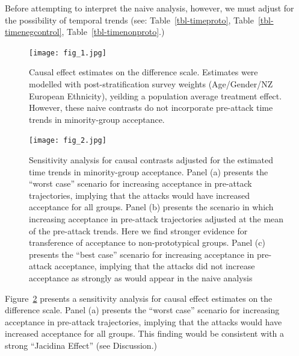 \documentclass[
  singlecolumn]{report}
\begin{document}
Before attempting to interpret the naive analysis, however, we must
adjust for the possibility of temporal trends (see:
Table~\ref{tbl-timeproto}, Table~\ref{tbl-timenegcontrol},
Table~\ref{tbl-timenonproto}.)

\begin{figure}

{\centering \texttt{[image: fig\_1.jpg]}

}

\caption{\label{fig-results1}Causal effect estimates on the difference
scale. Estimates were modelled with post-stratification survey weights
(Age/Gender/NZ European Ethnicity), yeilding a population average
treatment effect. However, these naive contrasts do not incorporate
pre-attack time trends in minority-group acceptance.}

\end{figure}

\begin{figure}

{\centering \texttt{[image: fig\_2.jpg]}

}

\caption{\label{fig-results2}Sensitivity analysis for causal contrasts
adjusted for the estimated time trends in minority-group acceptance.
Panel (a) presents the ``worst case'' scenario for increasing acceptance
in pre-attack trajectories, implying that the attacks would have
increased acceptance for all groups. Panel (b) presents the scenario in
which increasing acceptance in pre-attack trajectories adjusted at the
mean of the pre-attack trends. Here we find stronger evidence for
transference of acceptance to non-prototypical groups. Panel (c)
presents the ``best case'' scenario for increasing acceptance in
pre-attack acceptance, implying that the attacks did not increase
acceptance as strongly as would appear in the naive analysis}

\end{figure}

Figure~\ref{fig-results2} presents a sensitivity analysis for causal
effect estimates on the difference scale. Panel (a) presents the ``worst
case'' scenario for increasing acceptance in pre-attack trajectories,
implying that the attacks would have increased acceptance for all
groups. This finding would be consistent with a strong ``Jacidina
Effect'' (see Discussion.)
\end{document}

